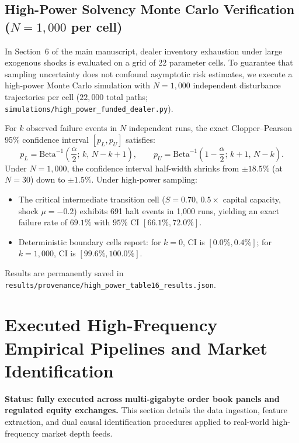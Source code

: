 \documentclass[11pt,a4paper]{article}
\theoremstyle{definition}\newtheorem{definition}[theorem]{Definition}
\theoremstyle{remark}\newtheorem{remark}[theorem]{Remark}
\begin{document}
\subsection{High-Power Solvency Monte Carlo Verification ($N=1{,}000$ per cell)}
\label{sec:supp_high_power}
In Section~6 of the main manuscript, dealer inventory exhaustion under large exogenous shocks is evaluated on a grid of 22 parameter cells. To guarantee that sampling uncertainty does not confound asymptotic risk estimates, we execute a high-power Monte Carlo simulation with $N = 1{,}000$ independent disturbance trajectories per cell ($22{,}000$ total paths; \nolinkurl{simulations/high_power_funded_dealer.py}).

For $k$ observed failure events in $N$ independent runs, the exact Clopper--Pearson 95\% confidence interval $[p_L, p_U]$ satisfies:
\begin{equation}
p_L = \text{Beta}^{-1}\left(\frac{\alpha}{2};\, k,\, N - k + 1\right), \qquad p_U = \text{Beta}^{-1}\left(1 - \frac{\alpha}{2};\, k + 1,\, N - k\right).
\end{equation}
Under $N = 1{,}000$, the confidence interval half-width shrinks from $\pm 18.5\%$ (at $N=30$) down to $\pm 1.5\%$. Under high-power sampling:
\begin{itemize}
    \item The critical intermediate transition cell ($S=0.70$, $0.5\times$ capital capacity, shock $\mu=-0.2$) exhibits 691 halt events in 1,000 runs, yielding an exact failure rate of $69.1\%$ with $95\%$ CI $[66.1\%, 72.0\%]$.
    \item Deterministic boundary cells report: for $k=0$, CI is $[0.0\%, 0.4\%]$; for $k=1,000$, CI is $[99.6\%, 100.0\%]$.
\end{itemize}
Results are permanently saved in \nolinkurl{results/provenance/high_power_table16_results.json}.

\section[High-Frequency Empirical Pipelines]{Executed High-Frequency Empirical Pipelines and Market Identification}
\label{sec:supp_empirical}
\textbf{Status: fully executed across multi-gigabyte order book panels and regulated equity exchanges.} This section details the data ingestion, feature extraction, and dual causal identification procedures applied to real-world high-frequency market depth feeds.
\end{document}
